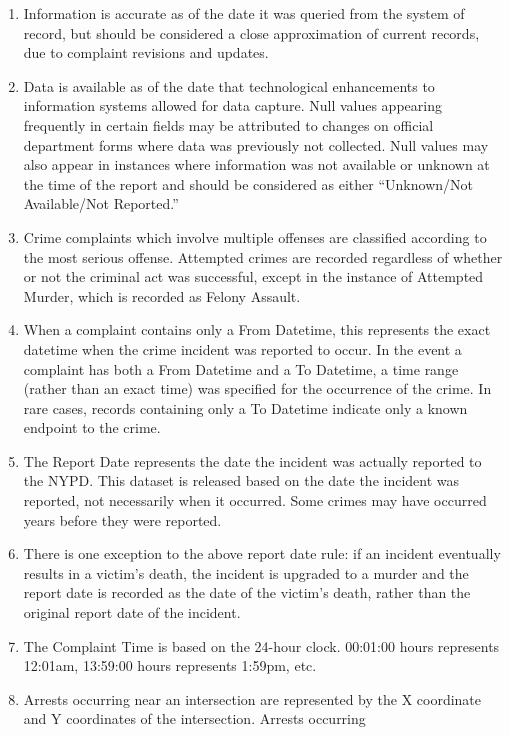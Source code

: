 \documentclass[
]{article}
\providecommand{\tightlist}{%
  \setlength{\itemsep}{0pt}\setlength{\parskip}{0pt}}
\begin{document}
\begin{enumerate}
\def\labelenumi{\arabic{enumi}.}
\tightlist
\item
  Information is accurate as of the date it was queried from the system
  of record, but should be considered a close approximation of current
  records, due to complaint revisions and updates.
\item
  Data is available as of the date that technological enhancements to
  information systems allowed for data capture. Null values appearing
  frequently in certain fields may be attributed to changes on official
  department forms where data was previously not collected. Null values
  may also appear in instances where information was not available or
  unknown at the time of the report and should be considered as either
  ``Unknown/Not Available/Not Reported.''
\item
  Crime complaints which involve multiple offenses are classified
  according to the most serious offense. Attempted crimes are recorded
  regardless of whether or not the criminal act was successful, except
  in the instance of Attempted Murder, which is recorded as Felony
  Assault.
\item
  When a complaint contains only a From Datetime, this represents the
  exact datetime when the crime incident was reported to occur. In the
  event a complaint has both a From Datetime and a To Datetime, a time
  range (rather than an exact time) was specified for the occurrence of
  the crime. In rare cases, records containing only a To Datetime
  indicate only a known endpoint to the crime.
\item
  The Report Date represents the date the incident was actually reported
  to the NYPD. This dataset is released based on the date the incident
  was reported, not necessarily when it occurred. Some crimes may have
  occurred years before they were reported.
\item
  There is one exception to the above report date rule: if an incident
  eventually results in a victim's death, the incident is upgraded to a
  murder and the report date is recorded as the date of the victim's
  death, rather than the original report date of the incident.
\item
  The Complaint Time is based on the 24-hour clock. 00:01:00 hours
  represents 12:01am, 13:59:00 hours represents 1:59pm, etc.
\item
  Arrests occurring near an intersection are represented by the X
  coordinate and Y coordinates of the intersection. Arrests occurring

\end{enumerate}
\end{document}

